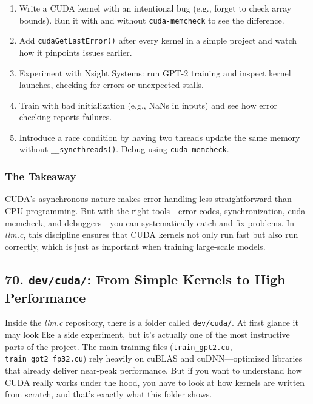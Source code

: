 \documentclass[
  letterpaper,
  DIV=11,
  numbers=noendperiod]{scrreprt}
\providecommand{\tightlist}{%
  \setlength{\itemsep}{0pt}\setlength{\parskip}{0pt}}
\begin{document}
\begin{enumerate}
\def\labelenumi{\arabic{enumi}.}
\tightlist
\item
  Write a CUDA kernel with an intentional bug (e.g., forget to check
  array bounds). Run it with and without \texttt{cuda-memcheck} to see
  the difference.
\item
  Add \texttt{cudaGetLastError()} after every kernel in a simple project
  and watch how it pinpoints issues earlier.
\item
  Experiment with Nsight Systems: run GPT-2 training and inspect kernel
  launches, checking for errors or unexpected stalls.
\item
  Train with bad initialization (e.g., NaNs in inputs) and see how error
  checking reports failures.
\item
  Introduce a race condition by having two threads update the same
  memory without \texttt{\_\_syncthreads()}. Debug using
  \texttt{cuda-memcheck}.
\end{enumerate}

\subsubsection{The Takeaway}\label{the-takeaway-58}

CUDA's asynchronous nature makes error handling less straightforward
than CPU programming. But with the right tools---error codes,
synchronization, cuda-memcheck, and debuggers---you can systematically
catch and fix problems. In \emph{llm.c}, this discipline ensures that
CUDA kernels not only run fast but also run correctly, which is just as
important when training large-scale models.

\subsection{\texorpdfstring{70. \texttt{dev/cuda/}: From Simple Kernels
to High
Performance}{70. dev/cuda/: From Simple Kernels to High Performance}}\label{devcuda-from-simple-kernels-to-high-performance}

Inside the \emph{llm.c} repository, there is a folder called
\texttt{dev/cuda/}. At first glance it may look like a side experiment,
but it's actually one of the most instructive parts of the project. The
main training files (\texttt{train\_gpt2.cu},
\texttt{train\_gpt2\_fp32.cu}) rely heavily on cuBLAS and
cuDNN---optimized libraries that already deliver near-peak performance.
But if you want to understand how CUDA really works under the hood, you
have to look at how kernels are written from scratch, and that's exactly
what this folder shows.
\end{document}
